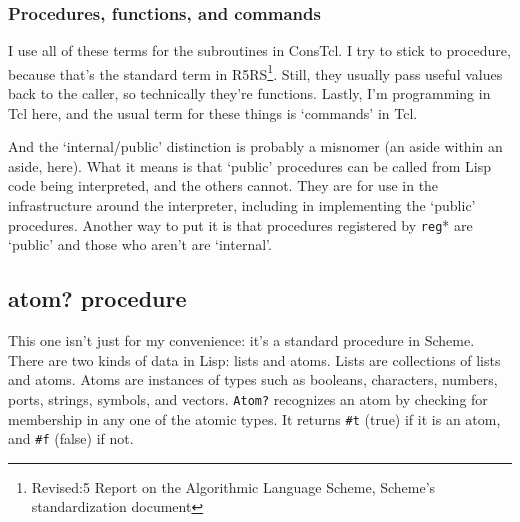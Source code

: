 \documentclass[twoside,9pt]{report}
\begin{document}
\begin{pulledtext}
\subsubsection{Procedures, functions, and commands}
\label{procedures,-functions,-and-commands}


I use all of these terms for the subroutines in ConsTcl. I try to stick to procedure, because that's the standard term in R5RS\footnote{Revised:5 Report on the Algorithmic Language Scheme, Scheme's standardization document}. Still, they usually pass useful values back to the caller, so technically they're functions. Lastly, I'm programming in Tcl here, and the usual term for these things is `commands' in Tcl.


And the `internal/public' distinction is probably a misnomer (an aside within an aside, here). What it means is that `public' procedures can be called from Lisp code being interpreted, and the others cannot. They are for use in the infrastructure around the interpreter, including in implementing the `public' procedures. Another way to put it is that procedures registered by \texttt{reg}* are `public' and those who aren't are `internal'.

\end{pulledtext}

\subsection{atom? procedure}
\label{atom?-procedure}


This one isn't just for my convenience: it's a standard procedure in Scheme. There are two kinds of data in Lisp: lists and atoms. Lists are collections of lists and atoms. Atoms are instances of types such as booleans, characters, numbers, ports, strings, symbols, and vectors. \texttt{Atom?} recognizes an atom by checking for membership in any one of the atomic types. It returns \texttt{\#t} (true) if it is an atom, and \texttt{\#f} (false) if not.
\end{document}
